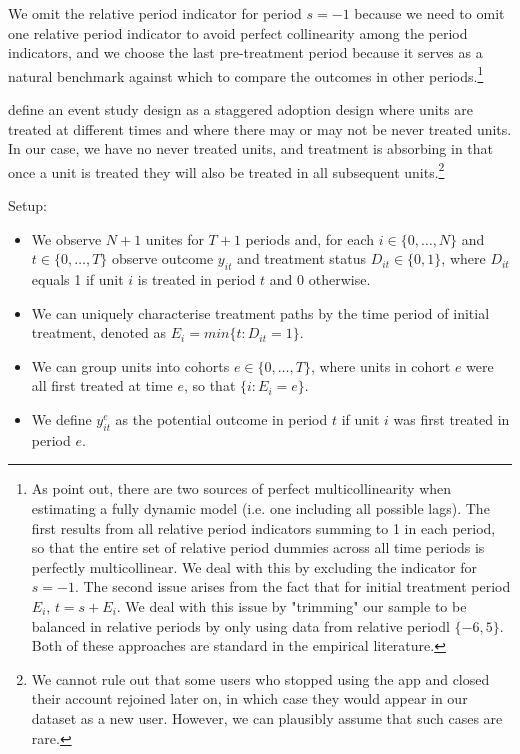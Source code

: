 We omit the relative period indicator for period $s = -1$ because we need to
omit one relative period indicator to avoid perfect collinearity among the
period indicators, and we choose the last pre-treatment period because it
serves as a natural benchmark against which to compare the outcomes in other
periods.\footnote{As \citet{sun2021estimating} point out, there are two sources
of perfect multicollinearity when estimating a fully dynamic model (i.e. one
including all possible lags). The first results from all relative period
indicators summing to 1 in each period, so that the entire set of relative period
dummies across all time periods is perfectly multicollinear. We deal with this
by excluding the indicator for $s = -1$. The second issue arises from the fact
that for initial treatment period $E_i$, $t = s + E_i$. We deal with this issue
by "trimming" our sample to be balanced in relative periods by only using
data from relative periodl $\{-6, 5\}$. Both of these approaches are standard
in the empirical literature.}


\citet{sun2021estimating} define an event study design as a staggered adoption
design where units are treated at different times and where there may or may
not be never treated units. In our case, we have no never treated units, and
treatment is absorbing in that once a unit is treated they will also be treated
in all subsequent units.\footnote{We cannot rule out that some users who
stopped using the app and closed their account rejoined later on, in which case
they would appear in our dataset as a new user. However, we can plausibly
assume that such cases are rare.} 

Setup:
\begin{itemize}
    \item We observe $N+1$ unites for $T+1$ periods and, for each
        $i\in\{0,\ldots, N\}$ and $t\in\{0,\ldots,T\}$ observe outcome $y_{it}$
        and treatment status $D_{it}\in\{0, 1\}$, where $D_{it}$ equals 1 if unit
        $i$ is treated in period $t$ and 0 otherwise.

    \item We can uniquely characterise treatment paths by the time period of
        initial treatment, denoted as $E_i = min\{t: D_{it} = 1\}$.

    \item We can group units into cohorts $e \in \{0,\ldots, T\}$, where units
        in cohort $e$ were all first treated at time $e$, so that $\{i: E_i =
        e\}$.

    \item We define $y^e_{it}$ as the potential outcome in period $t$ if unit
        $i$ was first treated in period $e$.

\end{itemize}


